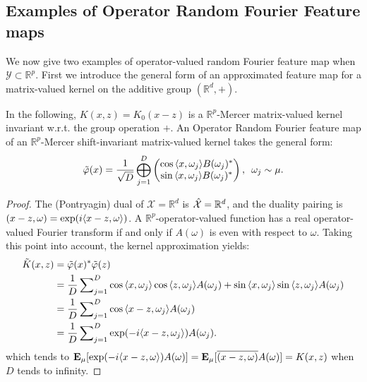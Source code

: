 \subsection{Examples of Operator Random Fourier Feature maps}
We now give two examples of operator-valued random Fourier feature map when $\mathcal{Y}\subset\mathbb{R}^p$. First we introduce the general form of an approximated feature map for a matrix-valued kernel on the additive group $(\mathbb{R}^d,+)$.
\begin{example}\label{ex:additive_group}
In the following, $K(x,z)=K_0(x-z)$ is a $\mathbb{R}^p$-Mercer matrix-valued kernel invariant w.r.t. the group operation $+$. %
An Operator Random Fourier feature map of an $\mathbb{R}^p$-Mercer shift-invariant matrix-valued kernel takes the general form:
\begin{equation*}
\begin{aligned}
\tildePhi(x)=\frac{1}{\sqrt{D}}\Vect_{j=1}^D\begin{pmatrix}\cos{\inner{x,\omega_j}}B(\omega_j)^* \\ \sin{\inner{x,\omega_j}}B(\omega_j)^*\end{pmatrix}, \enskip \omega_j \sim \mu.
\end{aligned}
\end{equation*}
\end{example}
\begin{proof}
The (Pontryagin) dual of $\mathcal{X}=\mathbb{R}^d$
is $\hat{\mathcal{X}}=\mathbb{R}^d$, and the duality pairing is $(x-z,\omega)=\exp(i\langle x-z, \omega\rangle)$. A $\mathbb{R}^p$-operator-valued function has a real operator-valued Fourier transform if and only if $A(\omega)$ is even with respect to $\omega$. Taking this point into account, the kernel approximation yields:
\begin{equation*}
\begin{aligned}
\tilde{K}(x,z)&=\tildePhi(x)^*\tildePhi(z) \\
&= \frac{1}{D} \sum\nolimits_{j=1}^D \cos{\inner{x,\omega_j}}\cos{\inner{z,\omega_j}} A(\omega_j) + \sin{\inner{x,\omega_j}}\sin{\inner{z,\omega_j}} A(\omega_j) \\
&= \frac{1}{D} \sum\nolimits_{j=1}^D \cos{\inner{x-z,\omega_j}}A(\omega_j) \\
&= \frac{1}{D} \sum\nolimits_{j=1}^D \exp(-i\inner{x-z, \omega_j})A(\omega_j).
\end{aligned}
\end{equation*}
which tends to ${\text{\textbf{E}}}_{\mu}[\exp(-i\langle x-z, \omega\rangle)A(\omega) ]={\text{\textbf{E}}}_{\mu}[\overline{(x-z,\omega)}A(\omega)]=K(x, z)$ when $D$ tends to infinity.
\end{proof}
